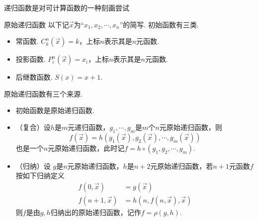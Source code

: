 递归函数是对可计算函数的一种刻画尝试
\begin{definition}{原始递归函数}
    以下记\(\vec x\)为“\(x_1,x_2,\cdots,x_n\)”的简写. 初始函数有三类.
    \begin{itemize}
        \item 常函数. \(C^n_k(\vec x) = k\)，上标\(n\)表示其是\(n\)元函数.
        \item 投影函数. \(P^n_i(\vec x) = x_i\)，上标\(n\)表示其是\(n\)元函数.
        \item 后继数函数. \(S(x) = x+1\).
    \end{itemize}
    原始递归函数有三个来源.
    \begin{itemize}
        \item 初始函数是原始递归函数.
        \item （复合）设\(h\)是\(m\)元递归函数，\(g_1,\cdots,g_m\)是\(m\)个\(n\)元原始递归函数，则
        \[f(\vec x) = h(g_1(\vec x),g_2(\vec x),\cdots,g_m(\vec x))\]
        也是一个\(n\)元原始递归函数，此时记\(f=h\circ(g_1,g_2,\cdots,g_m)\).
        \item （归纳）设 \(g\)是\(n\)元原始递归函数，\(h\)是\(n+2\)元原始递归函数，若\(n+1\)元函数\(f\)按如下归纳定义
        \begin{align*}
            f(0,\vec x) &= g(\vec x) \\
            f(n+1,\vec x) &= h(n,f(n,\vec x),\vec x)
        \end{align*}
        则\(f\)是由\(g,h\)归纳出的原始递归函数，记作\(f=\rho(g,h)\).
    \end{itemize}
\end{definition}

